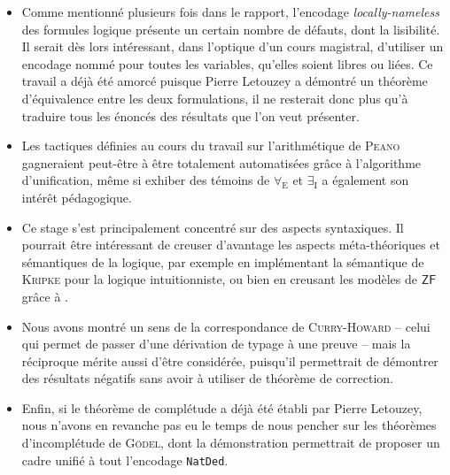 \documentclass[a4paper]{article}
\newcommand{\ZF}{\mathsf{ZF}}
\begin{document}
\begin{itemize}[label=$\bigstar$]
\item Comme mentionné plusieurs fois dans le rapport, l'encodage \emph{locally-nameless} des formules logique présente un certain nombre de défauts, dont la lisibilité. Il serait dès lors intéressant, dans l'optique d'un cours magistral, d'utiliser un encodage nommé pour toutes les variables, qu'elles soient libres ou liées. Ce travail a déjà été amorcé puisque Pierre Letouzey a démontré un théorème d'équivalence entre les deux formulations, il ne resterait donc plus qu'à traduire tous les énoncés des résultats que l'on veut présenter.

\item Les tactiques définies au cours du travail sur l'arithmétique de \textsc{Peano} gagneraient peut-être à être totalement automatisées grâce à l'algorithme d'unification, même si exhiber des témoins de $\forall_{\mathrm{E}}$ et $\exists_{\mathrm{I}}$ a également son intérêt pédagogique.

\item Ce stage s'est principalement concentré sur des aspects syntaxiques. Il pourrait être intéressant de creuser d'avantage les aspects méta-théoriques et sémantiques de la logique, par exemple en implémentant la sémantique de \textsc{Kripke} pour la logique intuitionniste, ou bien en creusant les modèles de $\ZF$ grâce à \cite{zfmod}.

\item Nous avons montré un sens de la correspondance de \textsc{Curry-Howard} -- celui qui permet de passer d'une dérivation de typage à une preuve -- mais la réciproque mérite aussi d'être considérée, puisqu'il permettrait de démontrer des résultats négatifs sans avoir à utiliser de théorème de correction.

\item Enfin, si le théorème de complétude a déjà été établi par Pierre Letouzey, nous n'avons en revanche pas eu le temps de nous pencher sur les théorèmes d'incomplétude de \textsc{Gödel}, dont la démonstration permettrait de proposer un cadre unifié à tout l'encodage \verb+NatDed+.
\end{itemize}

\newpage



\nocite{*}


\appendix
\newpage


\end{document}
